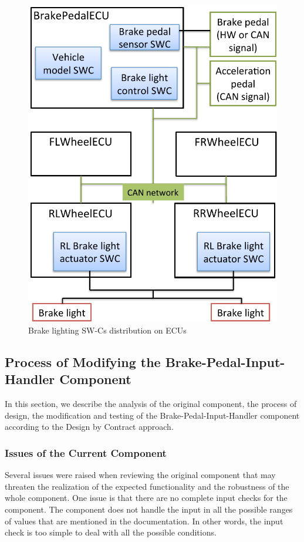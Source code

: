 \begin{figure}[htb]
\centering
\includegraphics[width=.68\columnwidth]{figure/brakelighting.pdf}
\caption{Brake lighting SW-Cs distribution on ECUs~\cite{pp}}
\label{fig:brakelighting}
\end{figure}

\subsection{Process of Modifying the Brake-Pedal-Input-Handler Component}

In this section, we describe the analysis of the original component, the process of design, the modification and testing of the Brake-Pedal-Input-Handler component according to the Design by Contract approach.

\subsubsection{Issues of the Current Component}
Several issues were raised when reviewing the original component that may threaten the realization of the expected functionality and the robustness of the whole component. One issue is that there are no complete input checks for the component. %
The component does not handle the input in all the possible ranges of values that are mentioned in the documentation. %
In other words, the input check is too simple to deal with all the possible conditions. 

